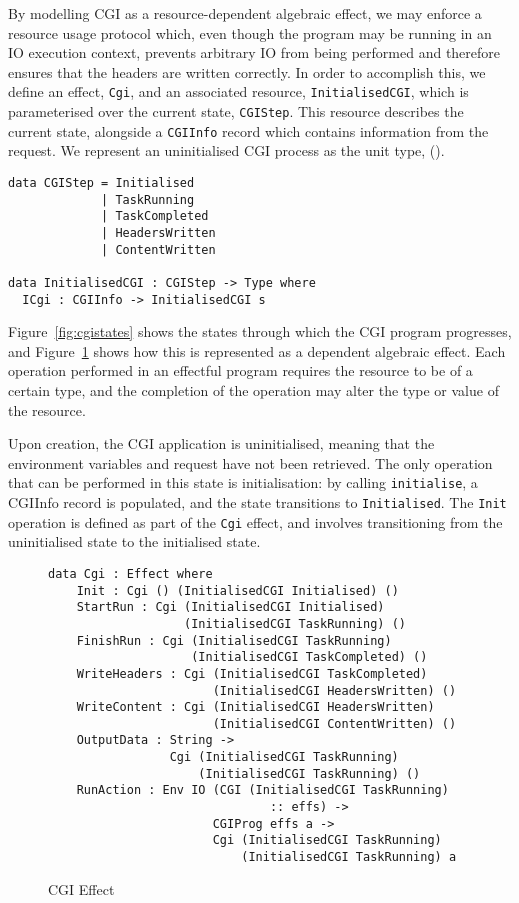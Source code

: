 \documentclass[preprint]{sigplanconf}
\begin{document}
By modelling CGI as a resource-dependent algebraic effect, we may enforce a resource usage protocol which, even though the program may be running in an IO execution context, prevents arbitrary IO from being performed and therefore ensures that the headers are written correctly. In order to accomplish this, we define an effect, \texttt{Cgi}, and an associated resource, \texttt{InitialisedCGI}, which is parameterised over the current state, \texttt{CGIStep}. This resource describes the current state, alongside a \texttt{CGIInfo} record which contains information from the request. We represent an uninitialised CGI process as the unit type, ().
\begin{Verbatim}[samepage]
data CGIStep = Initialised 
             | TaskRunning 
             | TaskCompleted 
             | HeadersWritten 
             | ContentWritten

data InitialisedCGI : CGIStep -> Type where
  ICgi : CGIInfo -> InitialisedCGI s
\end{Verbatim}
Figure~\ref{fig:cgistates} shows the states through which the CGI program
progresses, and Figure~\ref{fig:cgieffect} shows how this is represented
as a dependent algebraic effect. Each operation performed in an effectful
program requires the resource to be of a certain type, and the completion of
the operation may alter the type or value of the resource.

Upon creation, the CGI application is uninitialised, meaning that the
environment variables and request have not been retrieved. The only operation
that can be performed in this state is initialisation: by calling
\texttt{initialise}, a CGIInfo record is populated, and the state transitions
to \texttt{Initialised}. The \texttt{Init} operation is defined as part of the
\texttt{Cgi} effect, and involves transitioning from the uninitialised state to
the initialised state.

\begin{figure}[h]
\begin{Verbatim}
data Cgi : Effect where
    Init : Cgi () (InitialisedCGI Initialised) ()
    StartRun : Cgi (InitialisedCGI Initialised) 
                   (InitialisedCGI TaskRunning) ()
    FinishRun : Cgi (InitialisedCGI TaskRunning) 
                    (InitialisedCGI TaskCompleted) ()
    WriteHeaders : Cgi (InitialisedCGI TaskCompleted) 
                       (InitialisedCGI HeadersWritten) ()
    WriteContent : Cgi (InitialisedCGI HeadersWritten) 
                       (InitialisedCGI ContentWritten) ()
    OutputData : String -> 
                 Cgi (InitialisedCGI TaskRunning) 
                     (InitialisedCGI TaskRunning) ()
    RunAction : Env IO (CGI (InitialisedCGI TaskRunning) 
                               :: effs) -> 
                       CGIProg effs a -> 
                       Cgi (InitialisedCGI TaskRunning) 
                           (InitialisedCGI TaskRunning) a
\end{Verbatim}
\caption{CGI Effect}
\label{fig:cgieffect}
\end{figure}
\end{document}
